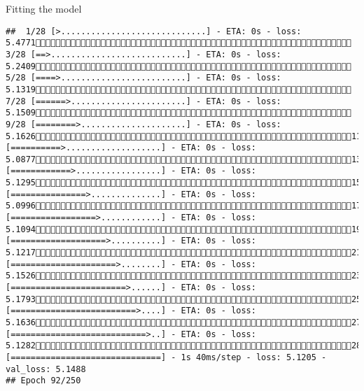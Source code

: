 \documentclass[
  ignorenonframetext,
]{beamer}
\begin{document}
\begin{frame}[fragile]{Fitting the model}
\begin{verbatim}
##  1/28 [>.............................] - ETA: 0s - loss: 5.4771 3/28 [==>...........................] - ETA: 0s - loss: 5.2409 5/28 [====>.........................] - ETA: 0s - loss: 5.1319 7/28 [======>.......................] - ETA: 0s - loss: 5.1509 9/28 [========>.....................] - ETA: 0s - loss: 5.162611/28 [==========>...................] - ETA: 0s - loss: 5.087713/28 [============>.................] - ETA: 0s - loss: 5.129515/28 [===============>..............] - ETA: 0s - loss: 5.099617/28 [=================>............] - ETA: 0s - loss: 5.109419/28 [===================>..........] - ETA: 0s - loss: 5.121721/28 [=====================>........] - ETA: 0s - loss: 5.152623/28 [=======================>......] - ETA: 0s - loss: 5.179325/28 [=========================>....] - ETA: 0s - loss: 5.163627/28 [===========================>..] - ETA: 0s - loss: 5.128228/28 [==============================] - 1s 40ms/step - loss: 5.1205 - val_loss: 5.1488
## Epoch 92/250

\end{verbatim}
\end{frame}
\end{document}
